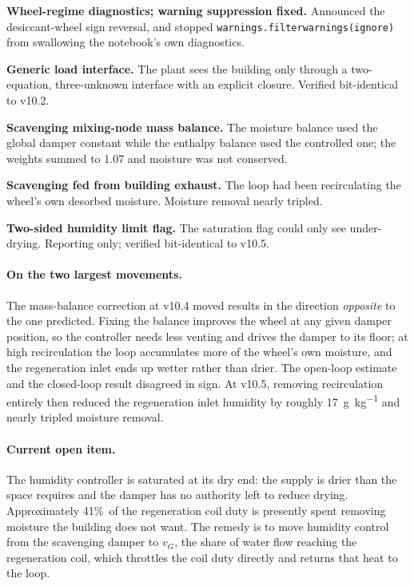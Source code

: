 \documentclass[11pt]{article}
\begin{document}
\begin{description}[leftmargin=3.2em,style=nextline]
\item[\textbf{v10.2}] \textbf{Wheel-regime diagnostics; warning suppression fixed.} Announced the desiccant-wheel sign reversal, and stopped \verb|warnings.filterwarnings(ignore)| from swallowing the notebook's own diagnostics.
\item[\textbf{v10.3}] \textbf{Generic load interface.} The plant sees the building only through a two-equation, three-unknown interface with an explicit closure. Verified bit-identical to v10.2.
\item[\textbf{v10.4}] \textbf{Scavenging mixing-node mass balance.} The moisture balance used the global damper constant while the enthalpy balance used the controlled one; the weights summed to 1.07 and moisture was not conserved.
\item[\textbf{v10.5}] \textbf{Scavenging fed from building exhaust.} The loop had been recirculating the wheel's own desorbed moisture. Moisture removal nearly tripled.
\item[\textbf{v10.6}] \textbf{Two-sided humidity limit flag.} The saturation flag could only see under-drying. Reporting only; verified bit-identical to v10.5.

\end{description}

\paragraph{On the two largest movements.} The mass-balance correction at v10.4
moved results in the direction \emph{opposite} to the one predicted. Fixing
the balance improves the wheel at any given damper position, so the controller
needs less venting and drives the damper to its floor; at high recirculation
the loop accumulates more of the wheel's own moisture, and the regeneration
inlet ends up wetter rather than drier. The open-loop estimate and the
closed-loop result disagreed in sign. At v10.5, removing recirculation
entirely then reduced the regeneration inlet humidity by roughly
\SI{17}{g\per\kilogram} and nearly tripled moisture removal.

\paragraph{Current open item.} The humidity controller is saturated at its dry
end: the supply is drier than the space requires and the damper has no
authority left to reduce drying. Approximately 41\%\ of the regeneration coil
duty is presently spent removing moisture the building does not want. The
remedy is to move humidity control from the scavenging damper to $v_G$, the
share of water flow reaching the regeneration coil, which throttles the coil
duty directly and returns that heat to the loop.
\end{document}
